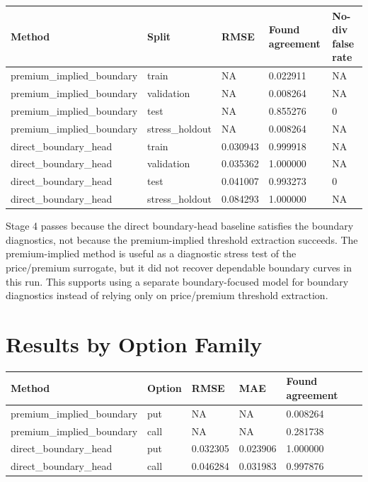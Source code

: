 \documentclass[11pt,a4paper]{article}
\begin{document}
\begin{longtable}{L{0.23\textwidth} L{0.16\textwidth} L{0.15\textwidth} L{0.15\textwidth} L{0.16\textwidth}}
\toprule
Method & Split & RMSE & Found agreement & No-div false rate \\
\midrule
\endhead
premium\_implied\_boundary & train & NA & 0.022911 & NA \\
premium\_implied\_boundary & validation & NA & 0.008264 & NA \\
premium\_implied\_boundary & test & NA & 0.855276 & 0 \\
premium\_implied\_boundary & stress\_holdout & NA & 0.008264 & NA \\
direct\_boundary\_head & train & 0.030943 & 0.999918 & NA \\
direct\_boundary\_head & validation & 0.035362 & 1.000000 & NA \\
direct\_boundary\_head & test & 0.041007 & 0.993273 & 0 \\
direct\_boundary\_head & stress\_holdout & 0.084293 & 1.000000 & NA \\
\bottomrule
\end{longtable}

Stage 4 passes because the direct boundary-head baseline satisfies the boundary diagnostics, not
because the premium-implied threshold extraction succeeds. The premium-implied method is useful as a
diagnostic stress test of the price/premium surrogate, but it did not recover dependable boundary
curves in this run. This supports using a separate boundary-focused model for boundary diagnostics
instead of relying only on price/premium threshold extraction.

\section{Results by Option Family}

\begin{longtable}{L{0.26\textwidth} L{0.15\textwidth} L{0.16\textwidth} L{0.16\textwidth} L{0.16\textwidth}}
\toprule
Method & Option & RMSE & MAE & Found agreement \\
\midrule
\endhead
premium\_implied\_boundary & put & NA & NA & 0.008264 \\
premium\_implied\_boundary & call & NA & NA & 0.281738 \\
direct\_boundary\_head & put & 0.032305 & 0.023906 & 1.000000 \\
direct\_boundary\_head & call & 0.046284 & 0.031983 & 0.997876 \\
\bottomrule
\end{longtable}
\end{document}
